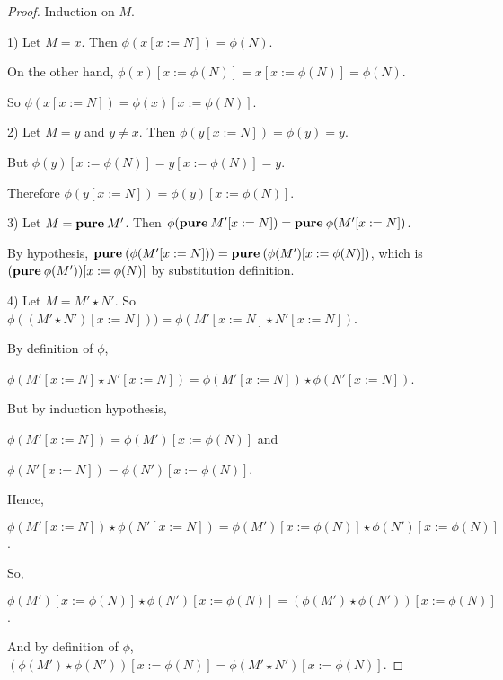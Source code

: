\documentclass[a4paper]{article}
\begin{document}
\begin{proof} Induction on $M$.

1) Let $M = x$. Then $\phi(x [x := N]) = \phi(N)$.

On the other hand, $\phi(x) [x := \phi(N)] = x [x := \phi(N)] = \phi(N)$.

So $\phi(x [x := N]) = \phi(x) [x := \phi(N)]$.

  \vspace{\baselineskip}

2) Let $M = y$ and $y \neq x$. Then $\phi(y [x := N]) = \phi(y) = y$.

But $\phi(y) [x := \phi(N)] = y [x := \phi(N)] = y$.

Therefore $\phi(y [x := N]) = \phi(y) [x := \phi(N)]$.

  \vspace{\baselineskip}

3) Let $M = {\bf pure \: } M'$. Then $\phi({\bf pure \: } M' [x := N]) = {\bf pure \: } \phi(M' [x := N])$.

By hypothesis, ${\bf pure \: } (\phi(M' [x := N])) = {\bf pure \: } (\phi(M') [x := \phi(N)])$, which is
$({\bf pure \: } \phi(M')) [x := \phi(N)]$ by substitution definition.

\vspace{\baselineskip}

4) Let $M = M' \star N'$. So $\phi((M' \star N') [x := N])) = \phi(M' [x := N] \star N' [x := N])$.

By definition of $\phi$,

\quad $\phi(M' [x := N] \star N' [x := N]) = \phi(M' [x := N]) \star \phi(N' [x := N])$.

But by induction hypothesis,

\quad $\phi(M' [x := N]) = \phi(M') [x := \phi(N)]$ and

\quad $\phi(N' [x := N]) = \phi(N') [x := \phi(N)]$.

Hence,

\quad $\phi(M' [x := N]) \star \phi(N' [x := N]) = \phi(M') [x := \phi(N)] \star \phi(N') [x := \phi(N)]$.

So,

\quad $\phi(M') [x := \phi(N)] \star \phi(N')[x := \phi(N)] = (\phi(M') \star \phi(N')) [x := \phi(N)]$.

And by definition of $\phi$, $(\phi(M') \star \phi(N')) [x := \phi(N)] = \phi(M' \star N') [x := \phi(N)]$.

\end{proof}
\end{document}
